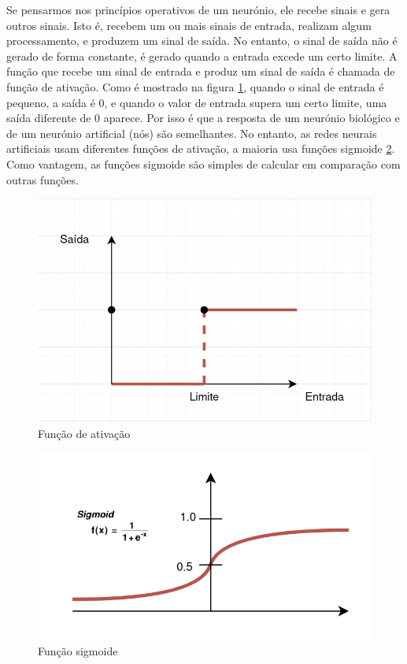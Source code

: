 Se pensarmos nos princípios operativos de um neurónio, ele recebe sinais e gera outros sinais. Isto é, recebem um ou mais sinais de entrada, realizam algum processamento, e produzem um sinal de saída. No entanto, o sinal de saída não é gerado de forma constante, é gerado quando a entrada excede um certo limite. A função que recebe um sinal de entrada e produz um sinal de saída é chamada de função de ativação. Como é mostrado na figura \ref{ativaçãoF}, quando o sinal de entrada é pequeno, a saída é 0, e quando o valor de entrada supera um certo limite, uma saída diferente de 0 aparece. Por isso é que a resposta de um neurónio biológico e de um neurónio artificial (nós) são semelhantes. No entanto, as redes neurais artificiais usam diferentes funções de ativação, a maioria usa funções sigmoide \ref{sigmoidF}. Como vantagem, as funções sigmoide são simples de calcular em comparação com outras funções.



\begin{figure}[H]
\centering
\includegraphics[scale=0.4]{figs/activation_function}
\caption{Função de ativação }\label{ativaçãoF}
\end{figure}


\begin{figure}[H]
\centering
\includegraphics[scale=0.3]{figs/sigmoid}
\caption{Função sigmoide }\label{sigmoidF}
\end{figure}


